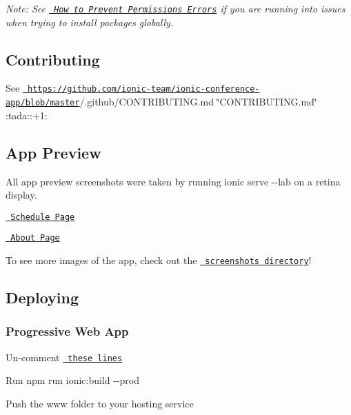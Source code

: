 {\itshape Note\+: See \href{https://docs.npmjs.com/getting-started/fixing-npm-permissions}{\texttt{ How to Prevent Permissions Errors}} if you are running into issues when trying to install packages globally.}

\subsection*{Contributing}

See \href{https://github.com/ionic-team/ionic-conference-app/blob/master}{\texttt{ https\+://github.\+com/ionic-\/team/ionic-\/conference-\/app/blob/master}}/.github/\+C\+O\+N\+T\+R\+I\+B\+U\+T\+I\+N\+G.\+md \char`\"{}\+C\+O\+N\+T\+R\+I\+B\+U\+T\+I\+N\+G.\+md\char`\"{} \+:tada\+:\+:+1\+:

\subsection*{App Preview}

All app preview screenshots were taken by running {\ttfamily ionic serve -\/-\/lab} on a retina display.


\begin{DoxyItemize}
\item \href{https://github.com/ionic-team/ionic-conference-app/blob/master/src/app/pages/schedule/schedule.html}{\texttt{ Schedule Page}}


\item \href{https://github.com/ionic-team/ionic-conference-app/blob/master/src/app/pages/about/about.html}{\texttt{ About Page}}


\item To see more images of the app, check out the \href{https://github.com/ionic-team/ionic-conference-app/tree/master/resources/screenshots}{\texttt{ screenshots directory}}!
\end{DoxyItemize}

\subsection*{Deploying}

\subsubsection*{Progressive Web App}


\begin{DoxyEnumerate}
\item Un-\/comment \href{https://github.com/ionic-team/ionic2-app-base/blob/master/src/index.html\#L21}{\texttt{ these lines}}
\item Run {\ttfamily npm run ionic\+:build -\/-\/prod}
\item Push the {\ttfamily www} folder to your hosting service
\end{DoxyEnumerate}

